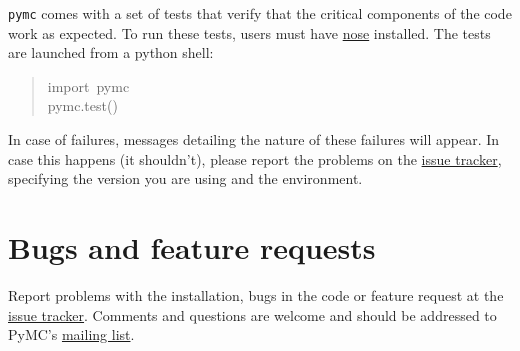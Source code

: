 \texttt{pymc} comes with a set of tests that verify that the critical components
of the code work as expected. To run these tests, users must have \href{http://somethingaboutorange.com/mrl/projects/nose/}{nose}
installed. The tests are launched from a python shell:
\begin{quote}{\ttfamily \raggedright \noindent
import~pymc~\\
pymc.test()
}\end{quote}

In case of failures, messages detailing the nature of these failures will
appear. In case this happens (it shouldn't), please report
the problems on the \href{http://code.google.com/p/pymc/issues/list.}{issue tracker}, specifying the version you are using and
the environment.



\hypertarget{bugs-and-feature-requests}{}
\section{Bugs and feature requests}
\label{bugs-and-feature-requests}

Report problems with the installation, bugs in the code or feature request at
the \href{http://code.google.com/p/pymc/issues/list.}{issue tracker}. Comments and questions are welcome and should be
addressed to PyMC's \href{mailto:pymc@googlegroups.com}{mailing list}.

